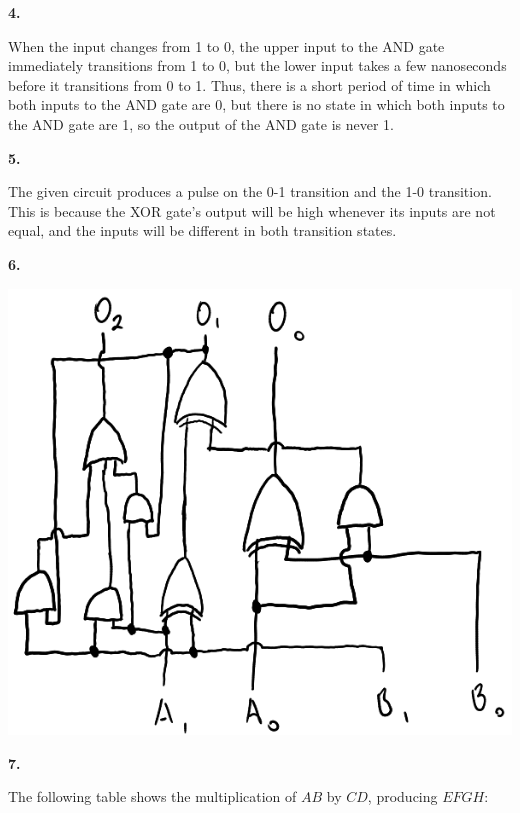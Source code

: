 \documentclass{article}
\begin{document}
\newpage\noindent\textbf{4.}

    When the input changes from 1 to 0, the upper input to the AND gate immediately transitions from 1 to 0, but the lower input takes a few nanoseconds before it transitions from 0 to 1. Thus, there is a short period of time in which both inputs to the AND gate are 0, but there is no state in which both inputs to the AND gate are 1, so the output of the AND gate is never 1.

\medskip\noindent\textbf{5.}

    The given circuit produces a pulse on the 0-1 transition and the 1-0 transition. This is because the XOR gate's output will be high whenever its inputs are not equal, and the inputs will be different in both transition states.

\medskip\noindent\textbf{6.}

\begin{center} \includegraphics{6.png} \end{center}

\newpage\noindent\textbf{7.} 
    
    The following table shows the multiplication of $AB$ by $CD$, producing $EFGH$:
\end{document}
